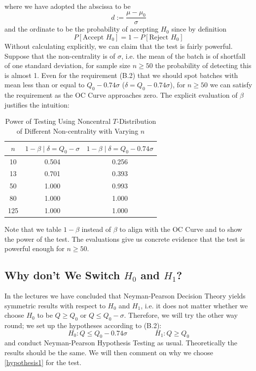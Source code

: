 \documentclass[12pt]{article}
\begin{document}
\noindent where we have adopted the abscissa to be
$$
d := \dfrac{\mu - \mu_0}{\sigma}
$$
and the ordinate to be the probability of accepting $H_0$ since by definition
$$
P[\text{Accept } H_0] = 1 - P[\text{Reject }H_0]
$$
Without calculating explicitly, we can claim that the test is fairly powerful. Suppose that the non-centrality is of $\sigma$, i.e. the mean of the batch is of shortfall of one standard deviation, for sample size $n\geq 50$ the probability of detecting this is almost 1. Even for the requirement (B.2) that we should spot batches with mean less than or equal to $Q_0 - 0.74\sigma$ ($\delta = Q_0 - 0.74\sigma$), for $n\geq 50$ we can satisfy the requirement as the OC Curve approaches zero. The explicit evaluation of $\beta$ justifies the intuition:

\begin{table}[htbp]
    \centering
    \begin{tabular}{ccc}
        \toprule
        $n$ & $1-\beta\mid\delta = Q_0 - \sigma$ & $1-\beta\mid\delta = Q_0 - 0.74\sigma$ \\
        \midrule
        10 & 0.504 & 0.256 \\
        13 & 0.701 & 0.393 \\
        50 & 1.000 & 0.993 \\
        80 & 1.000 & 1.000 \\
        125 & 1.000 & 1.000 \\
        \bottomrule
    \end{tabular}
    \caption{Power of Testing Using Noncentral $T$-Distribution of Different Non-centrality with Varying $n$}
\end{table}

\noindent Note that we table $1-\beta$ instead of $\beta$ to align with the OC Curve and to show the power of the test. The evaluations give us concrete evidence that the test is powerful enough for $n\geq 50$.

\subsection{Why don't We Switch $H_0$ and $H_1$?}

In the lectures \cite{Ho2023} we have concluded that Neyman-Pearson Decision Theory yields symmetric results with respect to $H_0$ and $H_1$, i.e. it does not matter whether we choose $H_0$ to be $Q \geq Q_0$ or $Q \leq Q_0 - \sigma$. Therefore, we will try the other way round; we set up the hypotheses according to (B.2):
\begin{equation}\label{hypothesis2}
    H_0 : Q\leq Q_0 - 0.74\sigma \quad\quad\quad\quad H_1 : Q\geq Q_0
\end{equation}
and conduct Neyman-Pearson Hypothesis Testing as usual. Theoretically the results should be the same. We will then comment on why we choose \eqref{hypothesis1} for the test. 
\end{document}
